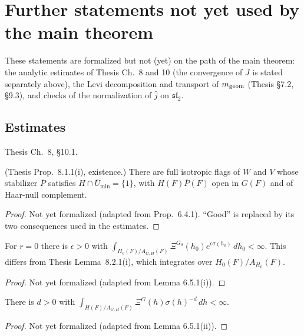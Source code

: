 \chapter{Further statements not yet used by the main theorem}
\label{chap:offpath}
These statements are formalized but not (yet) on the path of the main theorem: the analytic estimates of
Thesis Ch.~8 and 10 (the convergence of $J$ is stated separately above), the Levi decomposition and transport
of $m_{\mathrm{geom}}$ (Thesis \S7.2, \S9.3), and checks of the normalization of $\hat j$ on $\mathfrak{sl}_2$.

\section{Estimates}
Thesis Ch.~8, \S10.1.

\begin{proposition}
\label{exists_good_minimal_parabolic}
\leanok
{}
(Thesis Prop.~8.1.1(i), existence.) There are full isotropic flags of $W$ and $V$ whose stabilizer $\bar P$
satisfies $H\cap\bar U_{\min}=\{1\}$, with $H(F)\bar P(F)$ open in $G(F)$ and of Haar-null complement.
\end{proposition}
\begin{proof}
Not yet formalized (adapted from \cite{BP} Prop.~6.4.1). ``Good'' is replaced by its two consequences used in the estimates.
\end{proof}

\begin{lemma}
\label{lemma_6_5_1_i}
\leanok
{}
For $r=0$ there is $\epsilon>0$ with $\int_{H_0(F)/A_{G,H}(F)}\Xi^{G_0}(h_0)e^{\epsilon\sigma(h_0)}\,dh_0<\infty$.
This differs from Thesis Lemma~8.2.1(i), which integrates over $H_0(F)/A_{H_0}(F)$.
\end{lemma}
\begin{proof}
Not yet formalized (adapted from \cite{BP} Lemma 6.5.1(i)).
\end{proof}

\begin{lemma}
\label{lemma_6_5_1_ii}
\leanok
{}
There is $d>0$ with $\int_{H(F)/A_{G,H}(F)}\Xi^G(h)\sigma(h)^{-d}\,dh<\infty$.
\end{lemma}
\begin{proof}
Not yet formalized (adapted from \cite{BP} Lemma 6.5.1(ii)).
\end{proof}

